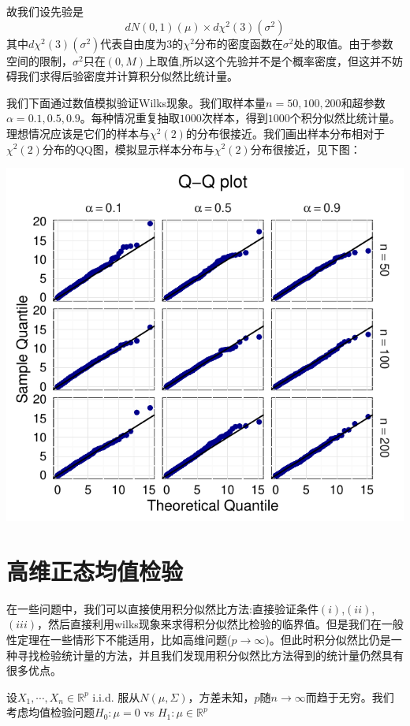 \documentclass[review]{elsarticle}
\begin{document}
故我们设先验是
\begin{equation}
    dN(0,1)(\mu)\times d\chi^2(3)(\sigma^2)
\end{equation}
其中$d\chi^2(3)(\sigma^2)$代表自由度为$3$的$\chi^2$分布的密度函数在$\sigma^2$处的取值。由于参数空间的限制，$\sigma^2$只在$(0,M)$上取值,所以这个先验并不是个概率密度，但这并不妨碍我们求得后验密度并计算积分似然比统计量。

我们下面通过数值模拟验证Wilks现象。我们取样本量$n=50,100,200$和超参数$\alpha=0.1,0.5,0.9$。每种情况重复抽取$1000$次样本，得到$1000$个积分似然比统计量。理想情况应该是它们的样本与$\chi^2(2)$的分布很接近。我们画出样本分布相对于$\chi^2(2)$分布的QQ图，模拟显示样本分布与$\chi^2(2)$分布很接近，见下图：

\includegraphics{myQQPlot.pdf}



\section{高维正态均值检验}
在一些问题中，我们可以直接使用积分似然比方法:直接验证条件$(i)$,$(ii)$,$(iii)$，然后直接利用wilks现象来求得积分似然比检验的临界值。但是我们在一般性定理在一些情形下不能适用，比如高维问题($p\to \infty$)。但此时积分似然比仍是一种寻找检验统计量的方法，并且我们发现用积分似然比方法得到的统计量仍然具有很多优点。

设$X_1,\cdots,X_n\in \mathbb{R}^p$ i.i.d. 服从$N(\mu,\Sigma)$，方差未知，$p$随$n\to \infty$而趋于无穷。我们考虑均值检验问题$H_0:\mu=0$ vs $H_1:\mu\in \mathbb{R}^p$
\end{document}
